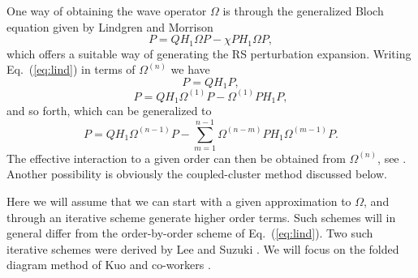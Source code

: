 \documentclass{article}
\begin{document}
One way of obtaining the wave operator
$\Omega$ is through the generalized Bloch
equation given by Lindgren and Morrison \cite{lm85}
\begin{equation}
[\Omega, H_0]P=QH_1\Omega P-\chi PH_1\Omega P,
\label{eq:lind}
\end{equation}
which offers a suitable way of generating the RS perturbation expansion.
Writing Eq.\ (\ref{eq:lind}) in terms of $\Omega^{(n)}$ we have
\begin{equation}
[\Omega^{(1)}, H_0]P=QH_1P,
\end{equation}
\begin{equation}
[\Omega^{(2)}, H_0]P=QH_1\Omega^{(1)} P- \Omega^{(1)} PH_1P,
\end{equation}
and so forth,  which can be generalized to
\begin{equation}
[\Omega^{(n)}, H_0]P=QH_1\Omega^{(n-1)} P- \sum_{m=1}^{n-1}
\Omega^{(n-m)} PH_1\Omega^{(m-1)}P.
\end{equation}
The effective interaction to a given order can then be obtained from
$\Omega^{(n)}$, see \cite{lm85}.
Another possibility is obviously the coupled-cluster method discussed
below.

Here we will assume that we can start with a given
approximation to $\Omega$, and through an iterative scheme generate
higher order terms. Such schemes will in general differ from the
order-by-order scheme of Eq.\ (\ref{eq:lind}).  Two such iterative
schemes were derived  by Lee and Suzuki \cite{ls80}. We will focus
on the folded diagram method of Kuo and co-workers \cite{ko90}.
\end{document}
